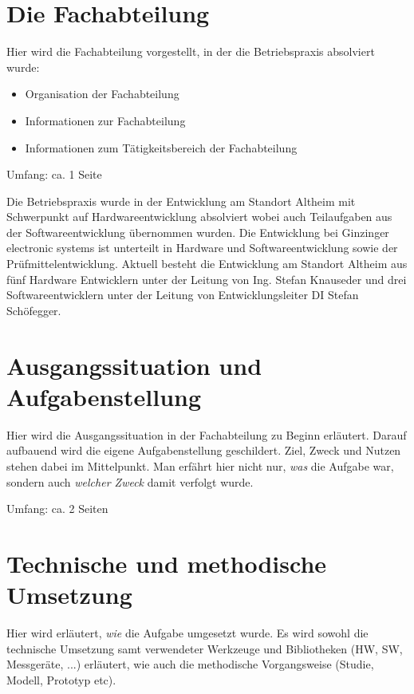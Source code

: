\documentclass[praktikum,german]{hgbthesis}
\begin{document}
\chapter{Die Fachabteilung}


\color{blue}
Hier wird die Fachabteilung vorgestellt, in der die Betriebspraxis absolviert wurde:
\begin{itemize}
	\item Organisation der Fachabteilung
	\item Informationen zur Fachabteilung
	\item Informationen zum Tätigkeitsbereich der Fachabteilung
\end{itemize}

\vskip 8mm
Umfang: ca. 1 Seite
\color{black}

Die Betriebspraxis wurde in der Entwicklung am Standort Altheim mit Schwerpunkt auf Hardwareentwicklung 
absolviert wobei auch Teilaufgaben aus der Softwareentwicklung übernommen wurden. 
Die Entwicklung bei Ginzinger electronic systems ist unterteilt in Hardware und Softwareentwicklung sowie der 
Prüfmittelentwicklung. Aktuell besteht die Entwicklung am Standort Altheim aus fünf Hardware Entwicklern unter der Leitung von Ing. Stefan Knauseder
und drei Softwareentwicklern unter der Leitung von Entwicklungsleiter DI Stefan Schöfegger.


\chapter{Ausgangssituation und Aufgabenstellung}
\color{blue}
Hier wird die Ausgangssituation in der Fachabteilung zu Beginn erläutert. Darauf aufbauend wird die eigene Aufgabenstellung geschildert. Ziel, Zweck und Nutzen stehen dabei im Mittelpunkt. Man erfährt hier nicht nur, \emph{was} die Aufgabe war, sondern auch \emph{welcher Zweck} damit verfolgt wurde.

\vskip 8mm
Umfang: ca. 2 Seiten
\color{black}


\chapter{Technische und methodische Umsetzung}
\color{blue}
Hier wird erläutert, \emph{wie} die Aufgabe umgesetzt wurde. Es wird sowohl die technische Umsetzung samt verwendeter Werkzeuge und Bibliotheken (HW, SW, Messgeräte, ...) erläutert, wie auch die methodische Vorgangsweise (Studie, Modell, Prototyp etc).
\end{document}
